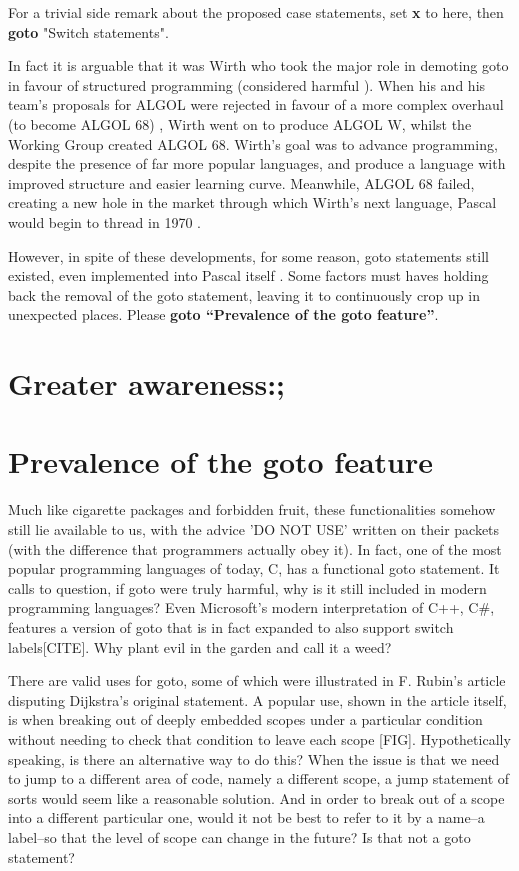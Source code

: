 \documentclass{journal}
\begin{document}
For a trivial side remark about the proposed case statements, set \textbf{x} to here, then \textbf{goto} "Switch statements".

In fact it is arguable that it was Wirth who took the major role in demoting goto in favour of structured programming (considered harmful \cite{harmfulstructure}). When his and his team's proposals for ALGOL were rejected in favour of a more complex overhaul (to become ALGOL 68) \cite{pascalrecollections}, Wirth went on to produce ALGOL W, whilst the Working Group created ALGOL 68. Wirth's goal was to advance programming, despite the presence of far more popular languages, and produce a language with improved structure and easier learning curve. Meanwhile, ALGOL 68 failed, creating a new hole in the market through which Wirth's next language, Pascal \cite{pascal} would begin to thread in 1970 \cite{pascalrecollections}.

However, in spite of these developments, for some reason, goto statements still existed, even implemented into Pascal itself \cite{pascal}. Some factors must haves holding back the removal of the goto statement, leaving it to continuously crop up in unexpected places. Please \textbf{goto ``Prevalence of the goto feature''}.

\section{Greater awareness:;}

\section{Prevalence of the goto feature}
Much like cigarette packages and forbidden fruit, these functionalities somehow still lie available to us, with the advice 'DO NOT USE' written on their packets (with the difference that programmers actually obey it).  In fact, one of the most popular programming languages of today, C, has a functional goto statement. It calls to question, if goto were truly harmful, why is it still included in modern programming languages? Even Microsoft's modern interpretation of C++, C\#, features a version of goto that is in fact expanded to also support switch labels[CITE]. Why plant evil in the garden and call it a weed?

There are valid uses for goto, some of which were illustrated in F. Rubin's article \cite{gotoodeep} disputing Dijkstra's original statement. A popular use, shown in the article itself, is when breaking out of deeply embedded scopes under a particular condition without needing to check that condition to leave each scope [FIG]. Hypothetically speaking, is there an alternative way to do this? When the issue is that we need to jump to a different area of code, namely a different scope, a jump statement of sorts would seem like a reasonable solution. And in order to break out of a scope into a different particular one, would it not be best to refer to it by a name--a label--so that the level of scope can change in the future? Is that not a goto statement?
\end{document}

